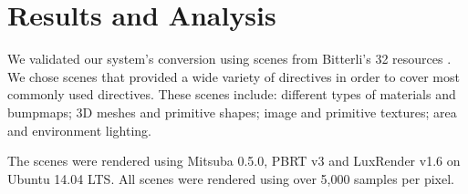 \section{Results and Analysis}
We validated our system's conversion using scenes from Bitterli's 32 resources 
\cite{resources16}. We chose scenes that provided a wide variety of directives 
in order to cover most commonly used directives. These scenes include: different 
types of materials and bumpmaps; 3D meshes and primitive shapes; image and 
primitive textures; area and environment lighting. 

The scenes were rendered using Mitsuba 0.5.0, PBRT v3 and LuxRender v1.6 on 
Ubuntu 14.04 LTS. All scenes were rendered using over 5,000 samples per pixel. 


